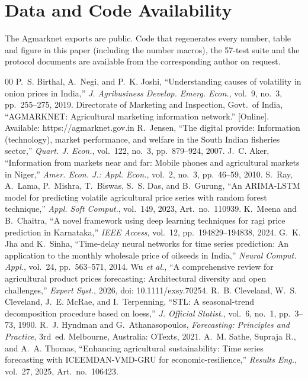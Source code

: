\documentclass{ieeeaccess}
\begin{document}
\section*{Data and Code Availability}
The Agmarknet exports are public. Code that regenerates every number, table and figure in this paper (including the number macros), the 57-test suite and the protocol documents are available from the corresponding author on request.

\begin{thebibliography}{00}
 P.~S. Birthal, A.~Negi, and P.~K. Joshi, ``Understanding causes of volatility in onion prices in India,'' \emph{J. Agribusiness Develop. Emerg. Econ.}, vol.~9, no.~3, pp.~255--275, 2019.
 Directorate of Marketing and Inspection, Govt.\ of India, ``AGMARKNET: Agricultural marketing information network.'' [Online]. Available: https://agmarknet.gov.in
 R.~Jensen, ``The digital provide: Information (technology), market performance, and welfare in the South Indian fisheries sector,'' \emph{Quart. J. Econ.}, vol.~122, no.~3, pp.~879--924, 2007.
 J.~C. Aker, ``Information from markets near and far: Mobile phones and agricultural markets in Niger,'' \emph{Amer. Econ. J.: Appl. Econ.}, vol.~2, no.~3, pp.~46--59, 2010.
 S.~Ray, A.~Lama, P.~Mishra, T.~Biswas, S.~S. Das, and B.~Gurung, ``An ARIMA-LSTM model for predicting volatile agricultural price series with random forest technique,'' \emph{Appl. Soft Comput.}, vol.~149, 2023, Art.\ no.~110939.
 K.~Meena and B.~Chaitra, ``A novel framework using deep learning techniques for ragi price prediction in Karnataka,'' \emph{IEEE Access}, vol.~12, pp.~194829--194838, 2024.
 G.~K. Jha and K.~Sinha, ``Time-delay neural networks for time series prediction: An application to the monthly wholesale price of oilseeds in India,'' \emph{Neural Comput. Appl.}, vol.~24, pp.~563--571, 2014.
 Wu \emph{et al.}, ``A comprehensive review for agricultural product prices forecasting: Architectural diversity and open challenges,'' \emph{Expert Syst.}, 2026, doi: 10.1111/exsy.70254.
 R.~B. Cleveland, W.~S. Cleveland, J.~E. McRae, and I.~Terpenning, ``STL: A seasonal-trend decomposition procedure based on loess,'' \emph{J. Official Statist.}, vol.~6, no.~1, pp.~3--73, 1990.
 R.~J. Hyndman and G.~Athanasopoulos, \emph{Forecasting: Principles and Practice}, 3rd~ed. Melbourne, Australia: OTexts, 2021.
 A.~M. Sathe, Supraja R., and A.~A. Thomas, ``Enhancing agricultural sustainability: Time series forecasting with ICEEMDAN-VMD-GRU for economic-resilience,'' \emph{Results Eng.}, vol.~27, 2025, Art.\ no.~106423.

\end{thebibliography}
\end{document}
